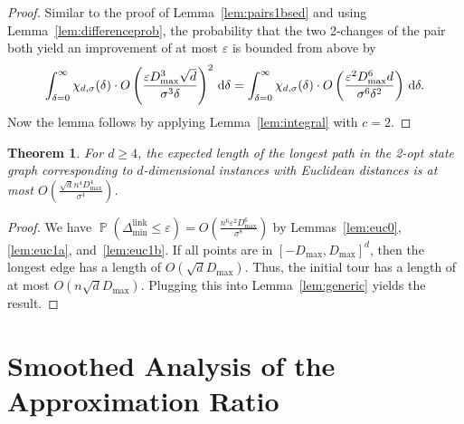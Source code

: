 \documentclass[11pt,DIV=12,a4paper]{scrartcl}
\newtheorem{theorem}[claim]{Theorem}
\newcommand{\eps}{\varepsilon}
\newcommand{\maxx}{D_{\max}}
\newcommand{\dminl}{\Delta_{\min}^{\operatorname{link}}}
\DeclareMathOperator{\probab}{\mathbb{P}}
\begin{document}
\begin{proof}
Similar to the proof of Lemma~\ref{lem:pairs1bsed} and using Lemma~\ref{lem:differenceprob}, the probability that
the two 2-changes of the pair both yield an improvement of at most $\eps$ is bounded from above by
\[
 \int_{\delta = 0}^\infty \chi_{d, \sigma}(\delta) \cdot O\left(\frac{\eps \maxx^3 \sqrt d}{\sigma^3 \delta} \right)^2 \, \textup d \delta
 = \int_{\delta = 0}^\infty \chi_{d, \sigma}(\delta) \cdot O\left(\frac{\eps^2 \maxx^6 d}{\sigma^6 \delta^2} \right) \, \textup d \delta.
\]
Now the lemma follows by applying Lemma~\ref{lem:integral} with $c = 2$.
\end{proof}

\begin{theorem}
For $d \geq 4$, the expected length of the longest path in the 2-opt state graph corresponding to $d$-dimensional instances
with Euclidean distances is at most $O(\frac{\sqrt d n^4 \maxx^4}{\sigma^4})$.
\end{theorem}

\begin{proof}
We have $\probab(\dminl \leq \eps) = O(\frac{n^6\eps^2 \maxx^6}{\sigma^8})$ by Lemmas~\ref{lem:euc0}, \ref{lem:euc1a}, and~\ref{lem:euc1b}.
If all points are in $[-\maxx, \maxx]^d$, then the longest edge has a length of $O(\sqrt d \maxx)$.
Thus, the initial tour has a length of at most $O(n \sqrt d \maxx)$.
Plugging this into Lemma~\ref{lem:generic} yields the result.
\end{proof}

%
%

\section{Smoothed Analysis of the Approximation Ratio}
\label{sec:apx}
\end{document}
